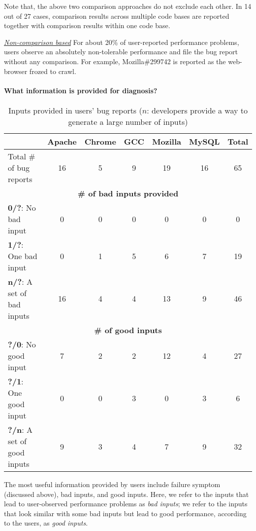 Note that, the above two comparison approaches do not exclude each other.
In 14 out of 27 cases, comparison results across multiple code bases are reported
together with comparison results within one code base.

\underline{\it Non-comparison based}
For about 20\% of user-reported performance problems, users observe an
absolutely non-tolerable performance and file the bug report without any comparison.
For example, Mozilla\#299742 is reported as the web-browser frozed to crawl.

\paragraph{What information is provided for diagnosis?}

\begin{table*}[tb!]
\begin{adjustwidth}{-.5in}{-.5in}
\scriptsize
\centering
{
\begin{tabular}{lcccccc}
\toprule
&Apache&Chrome&GCC&Mozilla&MySQL&Total\\
\midrule
Total \# of bug reports & 16 & 5 & 9 & 19 & 16 & 65 \\
\midrule
\multicolumn{7}{c}{\bf \# of bad inputs provided}\\
\multicolumn{1}{l}{{\bf 0/?}: No bad input }
&0&0&0&0&0&0\\
\multicolumn{1}{l}{{\bf 1/?}: One bad input}
&0&1&5&6&7&19\\
\multicolumn{1}{l}{{\bf n/?}: A set of bad inputs}
&16&4&4&13&9&46\\
\midrule
\multicolumn{7}{c}{\bf \# of good inputs}\\
\multicolumn{1}{l}{{\bf ?/0}: No good input}
&7&2&2&12&4&27\\
\multicolumn{1}{l}{{\bf ?/1}: One good input}
&0&0&3&0&3&6\\
\multicolumn{1}{l}{{\bf ?/n}: A set of good inputs}
&9&3&4&7&9&32\\
\bottomrule
\end{tabular}
}
\end{adjustwidth}
\caption{Inputs provided in users' bug reports ($n$: 
developers provide a way to generate a large number of inputs)}
\label{tab:5_input}
\end{table*}

The most useful information provided by users include failure
symptom (discussed above), bad inputs, and good inputs. Here, we refer to the 
inputs that lead to user-observed performance problems
as \textit{bad inputs}; we refer to the
inputs that look similar with some bad inputs but lead to good performance,
according to the users,
as \textit{good inputs}.

